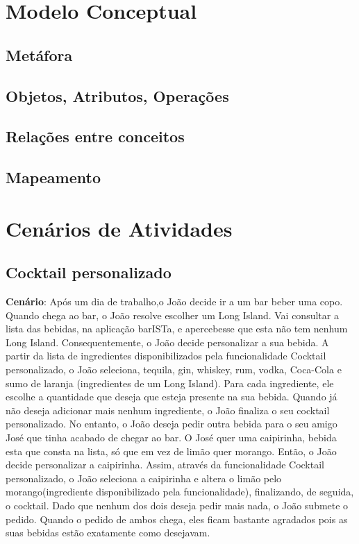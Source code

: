 \documentclass{article}
\begin{document}
\section*{Modelo Conceptual}



\subsection*{Metáfora}


\subsection*{Objetos, Atributos, Operações}

\subsection*{Relações entre conceitos}

\subsection*{Mapeamento}




\section*{Cenários de Atividades}

\subsection*{Cocktail personalizado}
\textbf{Cenário}: Após um dia de trabalho,o João decide ir a um bar beber uma copo. Quando chega ao bar, o João resolve  escolher um Long Island. Vai consultar a lista das bebidas, na aplicação barISTa, e apercebesse que esta não tem nenhum Long Island. Consequentemente, o João decide personalizar a sua bebida. A partir da lista de ingredientes disponibilizados pela funcionalidade Cocktail personalizado, o João seleciona, tequila, gin, whiskey, rum, vodka, Coca-Cola e sumo de laranja (ingredientes de um Long Island). Para cada ingrediente, ele escolhe a quantidade que deseja que esteja presente na sua bebida. Quando já não deseja adicionar mais nenhum ingrediente, o João finaliza o seu cocktail personalizado. No entanto, o João deseja pedir outra bebida para o seu amigo José que tinha acabado de chegar ao bar. O José quer uma caipirinha, bebida esta que consta na lista, só que em vez de limão quer morango. Então, o João decide personalizar a caipirinha. Assim, através da funcionalidade Cocktail personalizado, o João seleciona a caipirinha e altera o limão pelo morango(ingrediente disponibilizado pela funcionalidade), finalizando, de seguida, o cocktail. Dado que nenhum dos dois deseja pedir mais nada, o João submete o pedido. Quando o pedido de ambos chega, eles ficam bastante agradados pois as suas bebidas estão exatamente como desejavam.
\\
\end{document}
